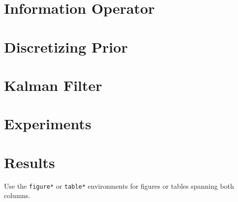 \newpage
\section{Information Operator}\label{sec:residual}


\newpage
\section{Discretizing Prior}\label{sec:matrix_exponential}


\newpage
\section{Kalman Filter}\label{sec:kalman_filter}


\newpage
\section{Experiments}


\newpage
\section{Results}
Use the \texttt{figure*} or \texttt{table*} environments for figures or tables spanning both columns.


\cite{example2024}
\printbibliography


